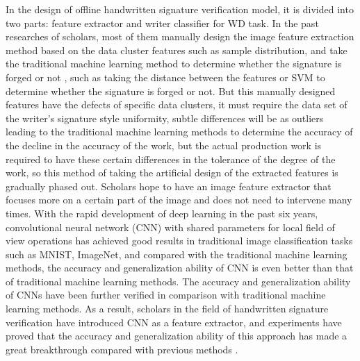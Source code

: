 In the design of offline handwritten signature verification model, it is divided into two parts: feature extractor and writer classifier for WD task. In the past researches of scholars, most of them manually design the image feature extraction method based on the data cluster features such as sample distribution, and take the traditional machine learning method to determine whether the signature is forged or not \cite{12}, such as taking the distance between the features or SVM to determine whether the signature is forged or not. But this manually designed features have the defects of specific data clusters, it must require the data set of the writer's signature style uniformity, subtle differences will be as outliers leading to the traditional machine learning methods to determine the accuracy of the decline in the accuracy of the work, but the actual production work is required to have these certain differences in the tolerance of the degree of the work, so this method of taking the artificial design of the extracted features is gradually phased out. Scholars hope to have an image feature extractor that focuses more on a certain part of the image and does not need to intervene many times. With the rapid development of deep learning in the past six years, convolutional neural network (CNN) with shared parameters for local field of view operations has achieved good results in traditional image classification tasks such as MNIST, ImageNet, and compared with the traditional machine learning methods, the accuracy and generalization ability of CNN is even better than that of traditional machine learning methods. The accuracy and generalization ability of CNNs have been further verified in comparison with traditional machine learning methods. As a result, scholars in the field of handwritten signature verification have introduced CNN as a feature extractor, and experiments have proved that the accuracy and generalization ability of this approach has made a great breakthrough compared with previous methods \cite{11}.

